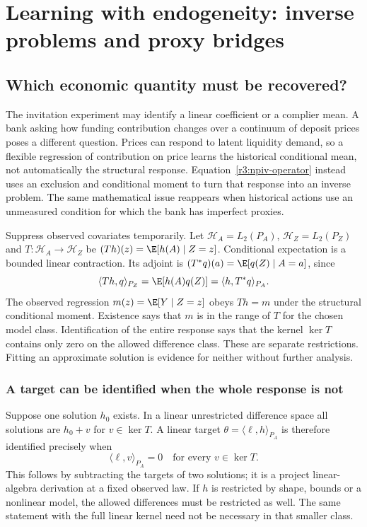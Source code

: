 \chapter{Learning with endogeneity: inverse problems and proxy bridges}
\label{r3:inverse-learning}
\section{Which economic quantity must be recovered?}
The invitation experiment may identify a linear coefficient or a complier
mean. A bank asking how funding contribution changes over a continuum of
deposit prices poses a different question. Prices can respond to latent
liquidity demand, so a flexible regression of contribution on price learns
the historical conditional mean, not automatically the structural response.
Equation~\eqref{r3:npiv-operator} instead uses an exclusion and conditional
moment to turn that response into an inverse problem. The same mathematical
issue reappears when historical actions use an unmeasured condition for
which the bank has imperfect proxies.

Suppress observed covariates temporarily. Let
$\mathcal H_A=L_2(P_A)$, $\mathcal H_Z=L_2(P_Z)$ and
$T:\mathcal H_A\to\mathcal H_Z$ be
$(Th)(z)=\E[h(A)\mid Z=z]$. Conditional expectation is a bounded
linear contraction. Its adjoint is
$(T^*q)(a)=\E[q(Z)\mid A=a]$, since
\[
 \langle Th,q\rangle_{P_Z}
 =\E[h(A)q(Z)]=\langle h,T^*q\rangle_{P_A}.
\]
The observed regression $m(z)=\E[Y\mid Z=z]$ obeys $Th=m$ under
the structural conditional moment. Existence says that $m$ is in the
range of $T$ for the chosen model class. Identification of the entire
response says that the kernel $\ker T$ contains only zero on the
allowed difference class. These are separate restrictions. Fitting
an approximate solution is evidence for neither without further analysis.

\subsection{A target can be identified when the whole response is not}
\label{r3:inverse-functional}
Suppose one solution $h_0$ exists. In a linear unrestricted difference
space all solutions are $h_0+v$ for $v\in\ker T$. A linear target
$\theta=\langle\ell,h\rangle_{P_A}$ is therefore identified precisely
when
\begin{equation}
 \langle\ell,v\rangle_{P_A}=0\quad\text{for every }v\in\ker T.
 \label{r3:null-functional}
\end{equation}
This follows by subtracting the targets of two solutions; it is a
project linear-algebra derivation at a fixed observed law. If $h$ is
restricted by shape, bounds or a nonlinear model, the allowed differences
must be restricted as well. The same statement with the full linear
kernel need not be necessary in that smaller class.

